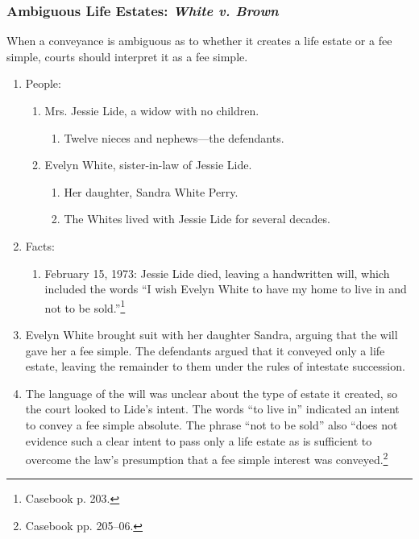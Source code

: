 \subsubsection{Ambiguous Life Estates: \emph{White v. Brown}}

When a conveyance is ambiguous as to whether it creates a life estate or a fee 
simple, courts should interpret it as a fee simple.

\begin{enumerate}
    \item People:
    \begin{enumerate}
        \item Mrs. Jessie Lide, a widow with no children.
        \begin{enumerate}
            \item Twelve nieces and nephews---the defendants.
        \end{enumerate}
        \item Evelyn White, sister-in-law of Jessie Lide.
        \begin{enumerate}
            \item Her daughter, Sandra White Perry.
            \item The Whites lived with Jessie Lide for several decades.
        \end{enumerate}
    \end{enumerate}
    \item Facts:
    \begin{enumerate}
        \item February 15, 1973: Jessie Lide died, leaving a handwritten will, 
        which included the words ``I wish Evelyn White to have my home to live 
        in and not to be sold.''\footnote{Casebook p. 203.}
    \end{enumerate}
    \item Evelyn White brought suit with her daughter Sandra, arguing that the 
    will gave her a fee simple. The defendants argued that it conveyed only a 
    life estate, leaving the remainder to them under the rules of intestate 
    succession.
    \item The language of the will was unclear about the type of estate it 
    created, so the court looked to Lide's intent. The words ``to live in'' 
    indicated an intent to convey a fee simple absolute. The phrase ``not to 
    be sold'' also ``does not evidence such a clear intent to pass only a life 
    estate as is sufficient to overcome the law's presumption that a fee 
    simple interest was conveyed.\footnote{Casebook pp. 205--06.}

\end{enumerate}
